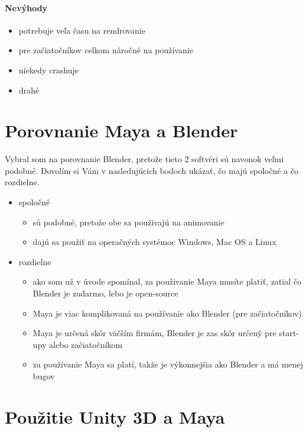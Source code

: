 \documentclass[10pt,oneside,slovak,a4paper]{article}
\begin{document}
\paragraph{Nevýhody}
\begin{itemize}
\item potrebuje veľa času na rendrovanie
\item pre začiatočníkov celkom náročné na používanie
\item niekedy crashuje
\item drahé
\end{itemize}

\section{Porovnanie Maya a Blender} \label{porovnanie}

Vybral som na porovnanie Blender, pretože tieto 2 softvéri sú navonok veľmi podobné. Dovolím si Vám v nasledujúcich bodoch ukázať, čo majú spoločné a čo rozdielne.

\begin{itemize}
\item spoločné
	\begin{itemize}
	\item sú podobné, pretože obe sa použivajú na animovanie
	\item dajú sa použiť na operačných systémoc Windows, Mac OS a Linux
	\end{itemize}

\item rozdielne
	\begin{itemize}
	\item ako som už v úvode spomínal, za použivanie Maya musíte platiť, zatial čo Blender je zadarmo, lebo je open-source
	\item Maya je viac komplikovaná na používanie ako Blender (pre začiatočníkov)
	\item Maya je určená skôr väčším firmám, Blender je zas skôr určený pre start-upy alebo začiatočníkom
	\item za používanie Maya sa platí, takže je výkonnejšia ako Blender a má menej bugov\cite{educba2021}
	\end{itemize}
\end{itemize}



\section{Použitie Unity 3D a Maya} \label{3d}
\end{document}
